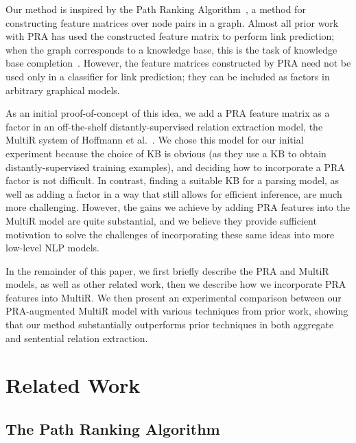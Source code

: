 \documentclass[11pt,a4paper]{article}
\begin{document}
Our method is inspired by the Path Ranking Algorithm~\cite[PRA]{lao-2010-pra},
a method for constructing feature matrices over node pairs in a graph.  Almost
all prior work with PRA has used the constructed feature matrix to perform link
prediction; when the graph corresponds to a knowledge base, this is the task of
knowledge base completion~\cite{lao-2011-pra2,lao-2012-syntactic-pra,%
dong-2014-knowledge-vault,gardner-2013-latent-pra,gardner-2014-vector-space-pra}.
However, the feature matrices constructed by PRA need not be used only in a
classifier for link prediction; they can be included as factors in arbitrary
graphical models.

As an initial proof-of-concept of this idea, we add a PRA feature matrix as a
factor in an off-the-shelf distantly-supervised relation extraction model, the
MultiR system of Hoffmann et al.~.
We chose this model for our initial experiment because the choice of KB is
obvious (as they use a KB to obtain distantly-supervised training examples),
and deciding how to incorporate a PRA factor is not difficult.  In contrast,
finding a suitable KB for a parsing model, as well as adding a factor in a way
that still allows for efficient inference, are much more challenging.  However,
the gains we achieve by adding PRA features into the MultiR model are quite
substantial, and we believe they provide sufficient motivation to solve the
challenges of incorporating these same ideas into more low-level NLP models.

In the remainder of this paper, we first briefly describe the PRA and MultiR
models, as well as other related work, then we describe how we incorporate PRA
features into MultiR.  We then present an experimental comparison between our
PRA-augmented MultiR model with various techniques from prior work, showing
that our method substantially outperforms prior techniques in both aggregate
and sentential relation extraction.

\section{Related Work}

\subsection{The Path Ranking Algorithm}
\end{document}
